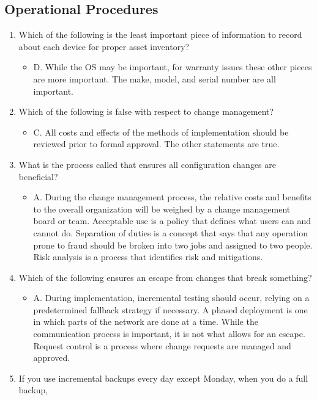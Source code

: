 \documentclass{article}
\begin{document}
\subsection{Operational Procedures} 
\begin{enumerate}
    \item Which of the following is the least important piece of information to record about each
device for proper asset inventory?
    \begin{itemize}
        \item D. While the OS may be important, for warranty issues these other pieces are more
important. The make, model, and serial number are all important.
    \end{itemize}
    \item Which of the following is false with respect to change management?
    \begin{itemize}
        \item C. All costs and effects of the methods of implementation should be reviewed prior to
formal approval. The other statements are true.
    \end{itemize}
    \item What is the process called that ensures all configuration changes are beneficial?
    \begin{itemize}
        \item A. During the change management process, the relative costs and benefits to the overall
organization will be weighed by a change management board or team. Acceptable use is
a policy that defines what users can and cannot do. Separation of duties is a concept that
says that any operation prone to fraud should be broken into two jobs and assigned to two
people. Risk analysis is a process that identifies risk and mitigations.
    \end{itemize}
    \item Which of the following ensures an escape from changes that break something?
    \begin{itemize}
        \item A. During implementation, incremental testing should occur, relying on a predetermined
fallback strategy if necessary. A phased deployment is one in which parts of the network are
done at a time. While the communication process is important, it is not what allows for an
escape. Request control is a process where change requests are managed and approved.
    \end{itemize}
    \item If you use incremental backups every day except Monday, when you do a full backup,

\end{enumerate}
\end{document}
